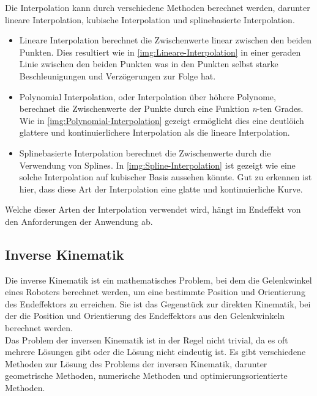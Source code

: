 \noindent
Die Interpolation kann durch verschiedene Methoden berechnet werden, darunter lineare Interpolation, kubische Interpolation und splinebasierte Interpolation.
\begin{itemize}
    \item Lineare Interpolation berechnet die Zwischenwerte linear zwischen den beiden Punkten. Dies resultiert wie in \autoref{img:Lineare-Interpolation} in einer geraden Linie zwischen den beiden Punkten was in den Punkten selbst starke Beschleunigungen und Verzögerungen zur Folge hat.
    \item Polynomial Interpolation, oder Interpolation über höhere Polynome, berechnet die Zwischenwerte der Punkte durch eine Funktion \textit{n}-ten Grades. Wie in \autoref{img:Polynomial-Interpolation} gezeigt ermöglicht dies eine deutlöich glattere und kontinuierlichere Interpolation als die lineare Interpolation.
    \item Splinebasierte Interpolation berechnet die Zwischenwerte durch die Verwendung von Splines. In \autoref{img:Spline-Interpolation} ist gezeigt wie eine solche Interpolation auf kubischer Basis aussehen könnte. Gut zu erkennen ist hier, dass diese Art der Interpolation eine glatte und kontinuierliche Kurve.
\end{itemize}
Welche dieser Arten der Interpolation verwendet wird, hängt im Endeffekt von den Anforderungen der Anwendung ab.\\

\subsection{Inverse Kinematik}\label{subsec:InverseKinematik}
Die inverse Kinematik ist ein mathematisches Problem, bei dem die Gelenkwinkel eines Roboters berechnet werden, um eine bestimmte Position und Orientierung des Endeffektors zu erreichen. Sie ist das Gegenstück zur direkten Kinematik, bei der die Position und Orientierung des Endeffektors aus den Gelenkwinkeln berechnet werden.\\
\noindent
Das Problem der inversen Kinematik ist in der Regel nicht trivial, da es oft mehrere Lösungen gibt oder die Lösung nicht eindeutig ist. Es gibt verschiedene Methoden zur Lösung des Problems der inversen Kinematik, darunter geometrische Methoden, numerische Methoden und optimierungsorientierte Methoden.
\\

